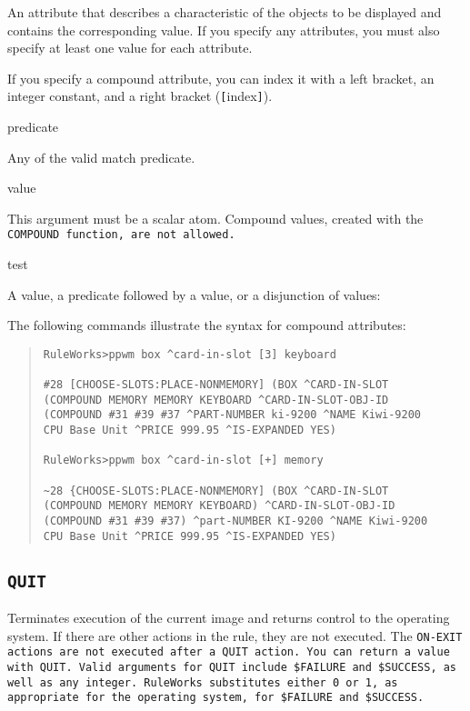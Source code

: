 {{\begin{arguments}
  An attribute that describes a characteristic of the objects to be
  displayed and contains the corresponding value. If you specify any
  attributes, you must also specify at least one value for each
  attribute.

  If you specify a compound attribute, you can index it with a left
  bracket, an integer constant, and a right bracket
  (\verb|[|index\verb|]|).

\item[predicate]

  Any of the valid match predicate.

\item[value]

  This argument must be a scalar atom. Compound values, created with
  the \tt{COMPOUND} function, are not allowed.

\item[test]

  A value, a predicate followed by a value, or a disjunction of
  values:
\end{arguments}

\Example

The following commands illustrate the syntax for compound
attributes:
\begin{quote}
\begin{verbatim}
RuleWorks>ppwm box ^card-in-slot [3] keyboard

#28 [CHOOSE-SLOTS:PLACE-NONMEMORY] (BOX ^CARD-IN-SLOT
(COMPOUND MEMORY MEMORY KEYBOARD ^CARD-IN-SLOT-OBJ-ID
(COMPOUND #31 #39 #37 ^PART-NUMBER ki-9200 ^NAME Kiwi-9200
CPU Base Unit ^PRICE 999.95 ^IS-EXPANDED YES)

RuleWorks>ppwm box ^card-in-slot [+] memory

~28 {CHOOSE-SLOTS:PLACE-NONMEMORY] (BOX ^CARD-IN-SLOT
(COMPOUND MEMORY MEMORY KEYBOARD) ^CARD-IN-SLOT-OBJ-ID
(COMPOUND #31 #39 #37) ^part-NUMBER KI-9200 ^NAME Kiwi-9200
CPU Base Unit ^PRICE 999.95 ^IS-EXPANDED YES)
\end{verbatim}
\end{quote}

\subsection{\tt{QUIT}}

Terminates execution of the current image and returns control to the
operating system. If there are other actions in the rule, they are not
executed. The \tt{ON-EXIT} actions are not executed after a \tt{QUIT}
action. You can return a value with \tt{QUIT}. Valid arguments for
\tt{QUIT} include \verb|$FAILURE| and \verb|$SUCCESS|, as well as any
integer. RuleWorks substitutes either 0 or 1, as appropriate for the
operating system, for \verb|$FAILURE| and \verb|$SUCCESS|.

}}
